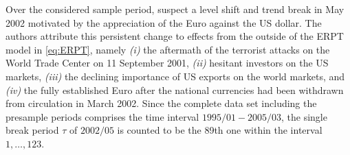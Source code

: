 Over the considered sample period, \citet{ArsovaOersal2016} suspect a level shift and trend break in May 2002 motivated by the appreciation of the Euro against the US dollar. The authors attribute this persistent change to effects from the outside of the ERPT model in \eqref{eq:ERPT}, namely \textit{(i)} the aftermath of the terrorist attacks on the World Trade Center on 11 September 2001, \textit{(ii)} hesitant investors on the US markets, \textit{(iii)} the declining importance of US exports on the world markets, and \textit{(iv)} the fully established Euro after the national currencies had been withdrawn from circulation in March 2002. Since the complete data set including the presample periods comprises the time interval $ 1995/01 - 2005/03 $, the single break period $ \tau $ of $ 2002/05 $ is counted to be the 89th one within the interval $ 1,\ldots,123$.

